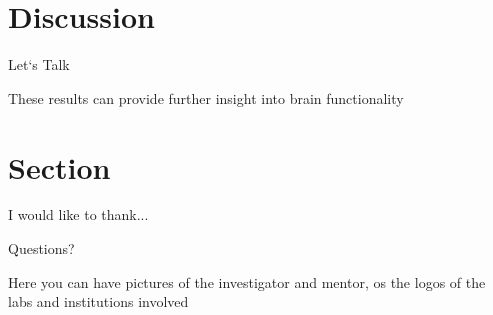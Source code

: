 \documentclass[12pt]{beamer}
\begin{document}
\section{\sc Discussion}


\begin{frame}{\sc Let`s Talk}


\begin{center}
These results can provide further insight into brain functionality
\end{center}




\end{frame}

\section{\sc Section}

\begin{frame}{\sc I would like to thank...}

\end{frame}




\begin{frame}{\sc Questions?}

\begin{center}
Here you can have pictures of the investigator and mentor, os the logos of the labs and institutions involved
\end{center}

\end{frame}
\end{document}
